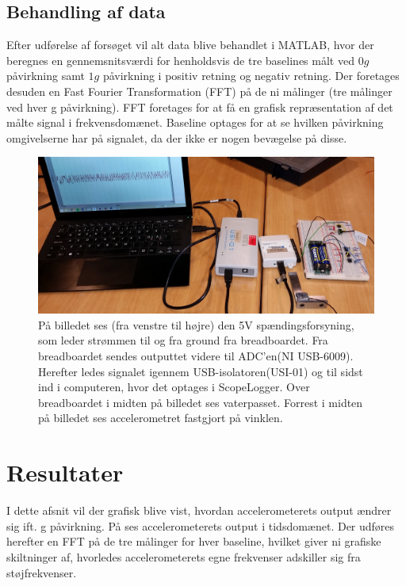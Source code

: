 \subsection{Behandling af data}
Efter udførelse af forsøget vil alt data blive behandlet i MATLAB, hvor der beregnes en gennemsnitsværdi for henholdsvis de tre baselines målt ved $0g$ påvirkning samt $1g$ påvirkning i positiv retning og negativ retning. Der foretages desuden en Fast Fourier Transformation (FFT) på de ni målinger (tre målinger ved hver g påvirkning). FFT foretages for at få en grafisk repræsentation af det målte signal i frekvensdomænet. Baseline optages for at se hvilken påvirkning omgivelserne har på signalet, da der ikke er nogen bevægelse på disse.

\begin{figure}[H]
	\centering
	\includegraphics[scale=0.14]{figures/cProblemloesning/Pilotforsoeg1_2.jpg}
	\caption{På billedet ses (fra venstre til højre) den 5V spændingsforsyning, som leder strømmen til og fra ground fra breadboardet. Fra breadboardet sendes outputtet videre til ADC'en(NI USB-6009). Herefter ledes signalet igennem USB-isolatoren(USI-01) og til sidst ind i computeren, hvor det optages i ScopeLogger. Over breadboardet i midten på billedet ses vaterpasset. Forrest i midten på billedet ses accelerometret fastgjort på vinklen.}
	\label{pforsoeg2}
\end{figure}

\section{Resultater}\label{Sec_Pilot_Data}
I dette afsnit vil der grafisk blive vist, hvordan accelerometerets output ændrer sig ift. g påvirkning. På  ses accelerometerets output i tidsdomænet. Der udføres herefter en FFT på de tre målinger for hver baseline, hvilket giver ni grafiske skiltninger af, hvorledes accelerometerets egne frekvenser adskiller sig fra støjfrekvenser.

